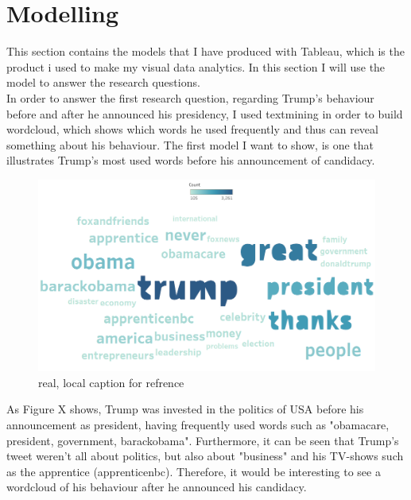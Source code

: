 \documentclass[11pt]{article}
\begin{document}
\section{Modelling}
This section contains the models that I have produced with Tableau, which is the product i used to make my visual data analytics. In this section I will use the model to answer the research questions. \\

In order to answer the first research question, regarding Trump's behaviour before and after he announced his presidency, I used textmining in order to build wordcloud, which shows which words he used frequently and thus can reveal something about his behaviour. The first model I want to show, is one that illustrates Trump's most used words before his announcement of candidacy.


\begin{figure}[H] %
	\centering %
\includegraphics [scale= .45]  {TrumpBeforeAnnouncementWordFinal}    %
	\caption[Optional caption] {real, local caption for refrence}
	\label{fig:wordcloudBliz}

\end{figure}

As Figure X shows, Trump was invested in the politics of USA before his announcement as president, having frequently used words such as "obamacare, president, government, barackobama". Furthermore, it can be seen that Trump's tweet weren't all about politics, but also about "business" and his TV-shows such as the apprentice (apprenticenbc). Therefore, it would be interesting to see a wordcloud of his behaviour after he announced his candidacy. 
\end{document}
